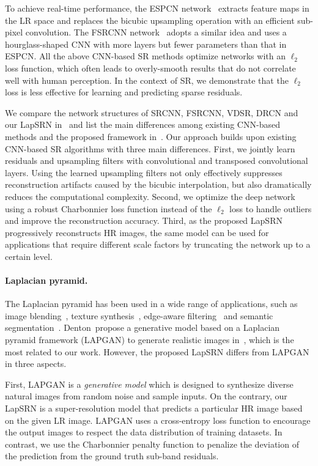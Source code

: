 \documentclass[10pt,twocolumn,letterpaper]{article}
\begin{document}
	
	To achieve real-time performance, the ESPCN network~\cite{ESPCN} extracts feature maps in the LR space and replaces the bicubic upsampling operation with an efficient sub-pixel convolution.
	The FSRCNN network~\cite{FSRCNN} adopts a similar idea and uses a hourglass-shaped CNN with more layers but fewer parameters than that in ESPCN.
	All the above CNN-based SR methods optimize networks with an $\ell_2$ loss function, which often leads to overly-smooth results that do not correlate well with human perception.
	In the context of SR, we demonstrate that the $\ell_2$ loss is less effective for learning and predicting sparse residuals.
	
	
	We compare the network structures of SRCNN, FSRCNN, VDSR, DRCN and our LapSRN in~ and list the main differences among existing CNN-based methods and the proposed framework in~.
	Our approach builds upon existing CNN-based SR algorithms with three main differences.
	First, we jointly learn residuals and upsampling filters with convolutional and transposed convolutional layers.
	Using the learned upsampling filters not only effectively suppresses reconstruction artifacts caused by the bicubic interpolation, but also dramatically reduces the computational complexity.
	Second, we optimize the deep network using a robust Charbonnier loss function instead of the $\ell_2$ loss to handle outliers and improve the reconstruction accuracy.
	Third, as the proposed LapSRN progressively reconstructs HR images, the same model can be used for applications that require different scale factors by truncating the network up to a certain level.
	
	
	\noindent\paragraph{Laplacian pyramid.} 
	The Laplacian pyramid has been used in a wide range of applications, such as image blending~\cite{Burt-1983}, texture synthesis~\cite{Heeger-TOG-1995}, edge-aware filtering~\cite{Paris-TOG-2011} and semantic segmentation~\cite{Ghiasi-ECCV-2016,Pinheiro-ECCV-2016}.
	Denton~\etal propose a generative model based on a Laplacian pyramid framework (LAPGAN) to generate realistic images in~\cite{LAPGAN}, which is the most related to our work.
	However, the proposed LapSRN differs from LAPGAN in three aspects.
	
	First, LAPGAN is a \emph{generative model} which is designed to synthesize diverse natural images from random noise and sample inputs.
	On the contrary, our LapSRN is a super-resolution model that predicts a particular HR image based on the given LR image.
	LAPGAN uses a cross-entropy loss function to encourage the output images to respect the data distribution of training datasets. 
	In contrast, we use the Charbonnier penalty function to penalize the deviation of the prediction from the ground truth sub-band residuals.
	
\end{document}
